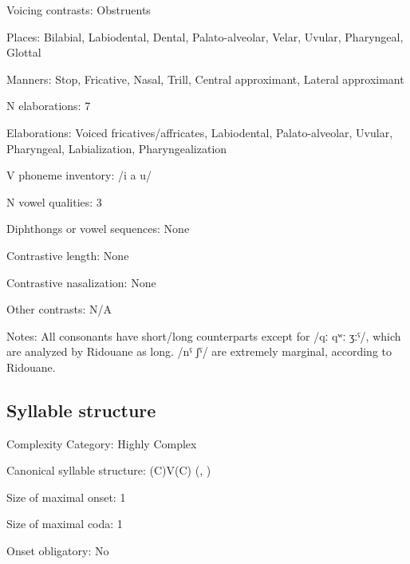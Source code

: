 {\begin{appendixdesc}
\item[Voicing contrasts:] Obstruents

\item[Places:] Bilabial, Labiodental, Dental, Palato-alveolar, Velar, Uvular, Pharyngeal, Glottal

\item[Manners:] Stop, Fricative, Nasal, Trill, Central approximant, Lateral approximant

\item[N elaborations:] 7

\item[Elaborations:] Voiced fricatives/affricates, Labiodental, Palato-alveolar, Uvular, Pharyngeal, Labialization, Pharyngealization

\item[V phoneme inventory:] /i a u/

\item[N vowel qualities:] 3

\item[Diphthongs or vowel sequences:] None

\item[Contrastive length:] None

\item[Contrastive nasalization:] None

\item[Other contrasts:] N/A

\item[Notes:] All consonants have short/long counterparts except for /qː qʷː ʒːˤ/, which are analyzed by Ridouane as long. /nˤ ʃˤ/ are extremely marginal, according to Ridouane.
\end{appendixdesc}
\subsection*{Syllable structure}
\begin{appendixdesc}

\item[Complexity Category:] Highly Complex

\item[Canonical syllable structure:] (C)V(C) (\citealt{DellElmedlaoui2002}, \citealt{Ridouane2008})

\item[Size of maximal onset:] 1

\item[Size of maximal coda:] 1

\item[Onset obligatory:] No


\end{appendixdesc}}
